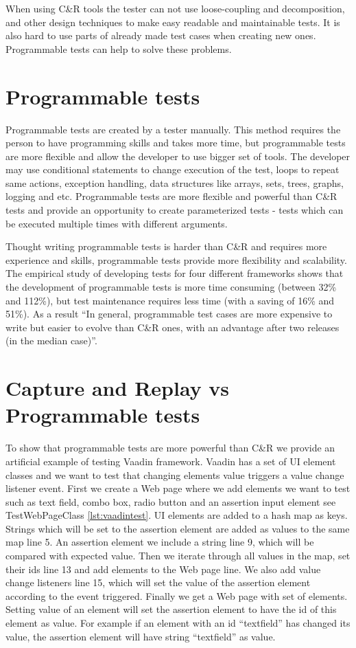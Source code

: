  When using C\&R tools the tester can
not use loose-coupling and decomposition, and other design techniques to make
easy readable and maintainable tests. It is also hard to use parts of already
made test cases when creating new ones. Programmable tests can help to solve these problems.

\section{Programmable tests} 
\label{sec:programTests}
Programmable tests are created by a tester manually. This method requires the
person to have programming skills and takes more time, but programmable tests
are more flexible and allow the developer to use bigger set of tools. The
developer may use conditional statements to change execution of the test,
loops to repeat same actions, exception handling, data structures like
arrays, sets, trees, graphs, logging and etc. Programmable tests are more
flexible and powerful than C\&R tests and provide an opportunity to create
parameterized tests - tests which can be executed multiple times with different arguments. 

      Thought writing programmable tests is harder than C\&R and requires more
      experience and skills, programmable tests provide more flexibility and scalability. The empirical study
       of developing tests for four different frameworks shows that the development of programmable tests is more time
      consuming (between 32\% and 112\%), but test maintenance requires less
      time (with a saving of 16\% and 51\%). As a result ``In general, programmable test cases are more
      expensive to write but easier to evolve than C\&R ones, with an advantage
      after two releases (in the median case)''.\cite{CaptureReplay7}

 \section{Capture and Replay vs Programmable tests}
 To show that programmable tests are more powerful than C\&R we provide an
artificial example of testing Vaadin framework.	
Vaadin has a set of UI element classes and we want to	test that changing elements value triggers a value change listener event.
First we create a Web page where we add elements we
want to test such as text field, combo box, radio button and an	assertion
input element see TestWebPageClass \ref{lst:vaadintest}.
 UI elements are added to a hash map as keys. Strings which will be set to the
 assertion element are added as values to the same map line 5.
			An assertion element we include a string line 9, which will be  compared with
      expected value.  Then we iterate through all values in the map, set their
      ids line 13 and add elements to the Web page line. We also add value
      change listeners line 15, which will set the value of the assertion
      element according to the event triggered. Finally we get a Web page with set of elements. 
      Setting value of an element will set the assertion element to have the id
      of this element as value. For example if an element with an id
      ``textfield'' has changed its value, the assertion element will have
      string ``textfield'' as value.
					
